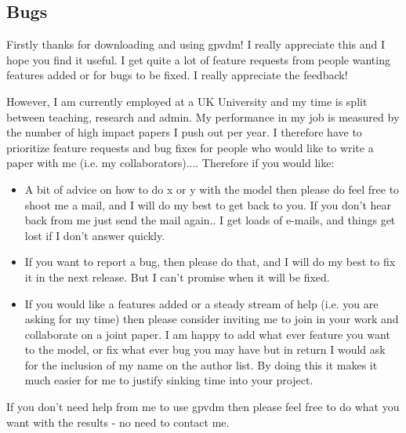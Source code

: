 \subsection{Bugs}
Firstly thanks for downloading and using gpvdm! I really appreciate this and I hope you find it useful. I get quite a lot of feature requests from people wanting features added or for bugs to be fixed. I really appreciate the feedback!

However, I am currently employed at a UK University and my time is split between teaching, research and admin. My performance in my job is measured by the number of high impact papers I push out per year. I therefore have to prioritize feature requests and bug fixes for people who would like to write a paper with me (i.e. my collaborators).... Therefore if you would like:

\begin{itemize}
  \item A bit of advice on how to do x or y with the model then please do feel free to shoot me a mail, and I will do my best to get back to you. If you don't hear back from me just send the mail again.. I get loads of e-mails, and things get lost if I don't answer quickly.
  \item If you want to report a bug, then please do that, and I will do my best to fix it in the next release. But I can't promise when it will be fixed.
  \item  If you would like a features added or a steady stream of help (i.e. you are asking for my time) then please consider inviting me to join in your work and collaborate on a joint paper. I am happy to add what ever feature you want to the model, or fix what ever bug you may have but in return I would ask for the inclusion of my name on the author list. By doing this it makes it much easier for me to justify sinking time into your project.
\end{itemize}
    
If you don't need help from me to use gpvdm then please feel free to do what you want with the results - no need to contact me.



